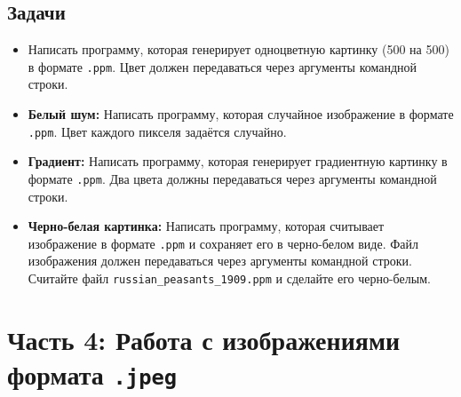 \documentclass{article}
\begin{document}
\subsection*{Задачи}
\begin{itemize}
\item Написать программу, которая генерирует одноцветную картинку (500 на 500) в формате \texttt{.ppm}. Цвет должен передаваться через аргументы командной строки.
\item \textbf{Белый шум:} Написать программу, которая случайное изображение в формате \texttt{.ppm}. Цвет каждого пикселя задаётся случайно.
\item \textbf{Градиент:} Написать программу, которая генерирует градиентную картинку в формате \texttt{.ppm}. Два цвета должны передаваться через аргументы командной строки.
\item \textbf{Черно-белая картинка:} Написать программу, которая считывает изображение в формате \texttt{.ppm} и сохраняет его в черно-белом виде. Файл изображения должен передаваться через аргументы командной строки. Считайте файл \texttt{russian\_peasants\_1909.ppm} и сделайте его черно-белым.
\end{itemize}


\newpage
\section*{Часть 4: Работа с изображениями формата \texttt{.jpeg}}
\end{document}
